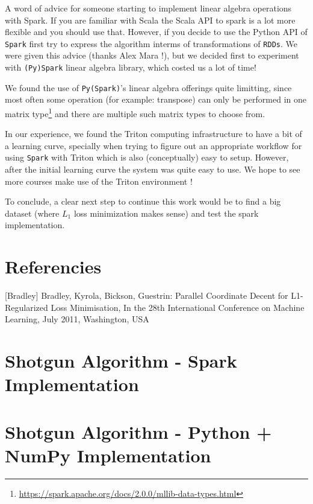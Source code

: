 \documentclass[a4paper,11pt]{article}
\begin{document}
A word of advice for someone starting to implement linear algebra operations with Spark. If you are familiar with Scala the Scala API to spark is a lot more flexible and you should use that. However, if you decide to use the Python API of \texttt{Spark} first try to express the algorithm interms of transformations of \texttt{RDDs}. We were given this advice (thanks Alex Mara !), but we decided first to experiment with \texttt{(Py)Spark} linear algebra library, which costed us a lot of time! \par
We found the use of \texttt{Py(Spark)}'s linear algebra offerings quite limitting, since most often some operation (for example: transpose) can only be performed in one matrix type\footnote{\url{https://spark.apache.org/docs/2.0.0/mllib-data-types.html}} and there are multiple such matrix types to choose from.\par
In our experience, we found the Triton computing infrastructure to have a bit of a learning curve, specially when trying to figure out an appropriate workflow for using \texttt{Spark} with Triton which is also (conceptually) easy to setup. However, after the initial learning curve the system was quite easy to use. We hope to see more courses make use of the Triton environment !\par
To conclude, a clear next step to continue this work would be to find a big dataset (where $L_1$ loss minimization makes sense) and test the spark implementation. \par
\section{Referencies}

[Bradley] Bradley, Kyrola, Bickson, Guestrin: Parallel Coordinate Decent for L1-Regularized Loss Minimisation, In the 28th International Conference on Machine Learning, July 2011, Washington, USA

\pagebreak
\appendix
\section{Shotgun Algorithm - Spark Implementation}\label{shotgun-spark}


\section{Shotgun Algorithm - Python + NumPy Implementation}\label{shotgun-py}

\end{document}
